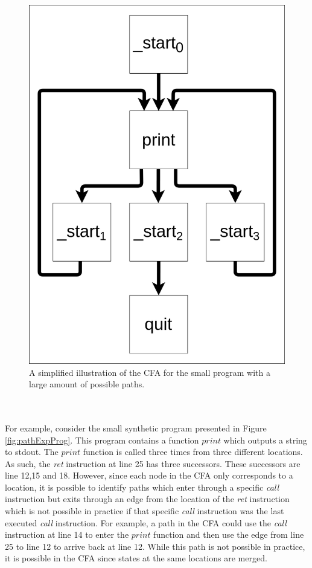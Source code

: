 \documentclass{kththesis}
\renewcommand{\it}[1]{\textit{#1}}
\begin{document}
\begin{figure}[!t]
    \centering
\includegraphics[scale=0.3]{Images/pathExpCFA.png}
    \caption{A simplified illustration of the CFA for the small program with a large amount of possible paths.}
    \label{fig:pathExpCFA}
\end{figure}
\\ \\
For example, consider the small synthetic program presented in Figure \ref{fig:pathExpProg}. This program contains a function $print$ which outputs a string to stdout. The $print$ function is called three times from three different locations. As such, the \it{ret} instruction at line 25 has three successors. These successors are line 12,15 and 18. However, since each node in the CFA only corresponds to a location, it is possible to identify paths which enter through a specific \it{call} instruction but exits through an edge from the location of the \it{ret} instruction which is not possible in practice if that specific \it{call} instruction was the last executed \it{call} instruction. For example, a path in the CFA could use the \it{call} instruction at line 14 to enter the $print$ function and then use the edge from line 25 to line 12 to arrive back at line 12. While this path is not possible in practice, it is possible in the CFA since states at the same locations are merged.
\end{document}
